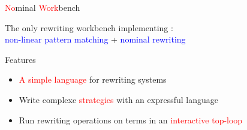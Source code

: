 \begin{frame}{\textcolor{red}{No}minal \textcolor{red}{Work}bench}

  The only rewriting workbench implementing : \\
  \textcolor{blue}{non-linear pattern matching} + \textcolor{blue}{nominal rewriting}

  \begin{block}{Features}
  \begin{itemize}
    \item \textcolor{red}{A simple language} for rewriting systems
    \item Write complexe \textcolor{red}{strategies} with an
      expressful language
    \item Run rewriting operations on terms in an \textcolor{red}{interactive top-loop}
  \end{itemize}
  \end{block}
  
\end{frame}




